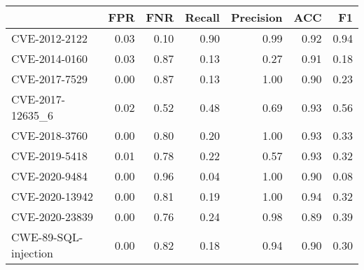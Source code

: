 \begin{tabular}{lrrrrrr}
\toprule
{} &  FPR &  FNR &  Recall &  Precision &  ACC &   F1 \\
\midrule
CVE-2012-2122        & 0.03 & 0.10 &    0.90 &       0.99 & 0.92 & 0.94 \\
CVE-2014-0160        & 0.03 & 0.87 &    0.13 &       0.27 & 0.91 & 0.18 \\
CVE-2017-7529        & 0.00 & 0.87 &    0.13 &       1.00 & 0.90 & 0.23 \\
CVE-2017-12635\_6     & 0.02 & 0.52 &    0.48 &       0.69 & 0.93 & 0.56 \\
CVE-2018-3760        & 0.00 & 0.80 &    0.20 &       1.00 & 0.93 & 0.33 \\
CVE-2019-5418        & 0.01 & 0.78 &    0.22 &       0.57 & 0.93 & 0.32 \\
CVE-2020-9484        & 0.00 & 0.96 &    0.04 &       1.00 & 0.90 & 0.08 \\
CVE-2020-13942       & 0.00 & 0.81 &    0.19 &       1.00 & 0.94 & 0.32 \\
CVE-2020-23839       & 0.00 & 0.76 &    0.24 &       0.98 & 0.89 & 0.39 \\
CWE-89-SQL-injection & 0.00 & 0.82 &    0.18 &       0.94 & 0.90 & 0.30 \\
\bottomrule
\end{tabular}
